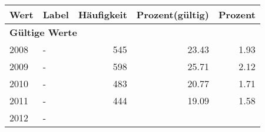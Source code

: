      \begin{longtable}{lXrrr}
     \toprule
     \textbf{Wert} & \textbf{Label} & \textbf{Häufigkeit} & \textbf{Prozent(gültig)} & \textbf{Prozent} \\
     \endhead
     \midrule
     \multicolumn{5}{l}{\textbf{Gültige Werte}}\\

     2008 &
     \multicolumn{1}{X}{ -  } &


       \num{545} &
       \num[round-mode=places,round-precision=2]{23.43} &
         \num[round-mode=places,round-precision=2]{1.93} \\

     2009 &
     \multicolumn{1}{X}{ -  } &


       \num{598} &
       \num[round-mode=places,round-precision=2]{25.71} &
         \num[round-mode=places,round-precision=2]{2.12} \\

     2010 &
     \multicolumn{1}{X}{ -  } &


       \num{483} &
       \num[round-mode=places,round-precision=2]{20.77} &
         \num[round-mode=places,round-precision=2]{1.71} \\

     2011 &
     \multicolumn{1}{X}{ -  } &


       \num{444} &
       \num[round-mode=places,round-precision=2]{19.09} &
         \num[round-mode=places,round-precision=2]{1.58} \\

     2012 &
     \multicolumn{1}{X}{ -  } &



\end{longtable}
